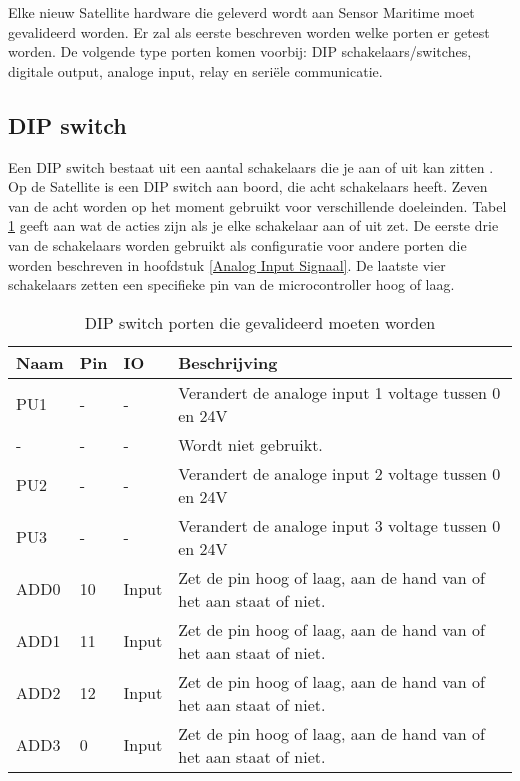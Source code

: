 Elke nieuw Satellite hardware die geleverd wordt aan Sensor Maritime moet gevalideerd worden. Er zal als eerste beschreven worden welke porten er getest worden. De volgende type porten komen voorbij: DIP schakelaars/switches, digitale output, analoge input, relay en seriële communicatie.

\subsection{DIP switch}
Een DIP switch bestaat uit een aantal schakelaars die je aan of uit kan zitten \autocite{DIP}. Op de Satellite is een DIP switch aan boord, die acht schakelaars heeft. Zeven van de acht worden op het moment gebruikt voor verschillende doeleinden. Tabel \ref{tab:hw_val_dip} geeft aan wat de acties zijn als je elke schakelaar aan of uit zet. De eerste drie van de schakelaars worden gebruikt als configuratie voor andere porten die worden beschreven in hoofdstuk \ref{Analog Input Signaal}. De laatste vier schakelaars zetten een specifieke pin van de microcontroller hoog of laag.
\begin{table}[h!]
	\caption{DIP switch porten die gevalideerd moeten worden}
	\begin{tabular}{lllp{12cm}}
	\toprule
	\textbf{Naam} & \textbf{Pin} & \textbf{IO} & \textbf{Beschrijving}	\\ \toprule
	PU1		& - 	& -    		& Verandert de analoge input 1 voltage tussen 0 en 24V	\\
	-		& - 	& -    		& Wordt niet gebruikt.								\\
	PU2		& - 	& -    		& Verandert de analoge input 2 voltage tussen 0 en 24V	\\
	PU3		& - 	& -    		& Verandert de analoge input 3 voltage tussen 0 en 24V	\\
	ADD0 	& 10	& Input		& Zet de pin hoog of laag, aan de hand van of het aan staat of niet.		\\
	ADD1 	& 11	& Input		& Zet de pin hoog of laag, aan de hand van of het aan staat of niet.		\\
	ADD2 	& 12	& Input		& Zet de pin hoog of laag, aan de hand van of het aan staat of niet.		\\
	ADD3 	& 0 	& Input		& Zet de pin hoog of laag, aan de hand van of het aan staat of niet.		\\ \bottomrule
	\end{tabular}
	\label{tab:hw_val_dip}
\end{table}

